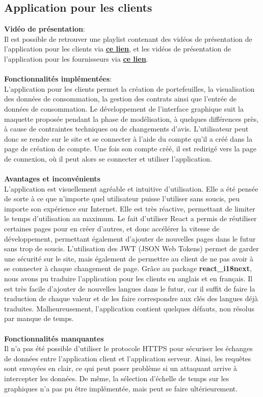 \documentclass[../rapport.tex]{subfiles}
\begin{document}
\subsection{Application pour les clients}
\noindent \textbf{Vidéo de présentation}: \\ 
Il est possible de retrouver une playlist contenant des vidéos de présentation de l'application pour les clients via \href{https://www.youtube.com/playlist?list=PLchvW_pzTBEoOUYVuWbljnQA548oJUMm5}{\textbf{ce lien}}, et les vidéos de présentation de l'application pour les fournisseurs via \href{https://youtube.com/playlist?list=PLoqkbU5JK0C9hzut7JvQ1AznLSYIX3d5O}{\textbf{ce lien}}. \\ \\
\textbf{Fonctionnalités implémentées}: \\
L'application pour les clients permet la création de portefeuilles, la visualisation des données de consommation, la gestion des contrats ainsi que l'entrée de données de consommation. 
Le développement de l'interface graphique suit la maquette proposée pendant la phase de modélisation, à quelques différences près, à cause de contraintes techniques ou de changements d'avis. L'utilisateur peut donc se rendre sur le site et se connecter à l'aide du compte qu'il a créé dans la page de création de compte. Une fois son compte créé, il est redirigé vers la page de connexion, où il peut alors se connecter et utiliser l'application.
\\ \\
\textbf{Avantages et inconvénients} \\
L'application est visuellement agréable et intuitive d'utilisation. Elle a été pensée de sorte à ce que n'importe quel utilisateur puisse l'utiliser sans soucis, peu importe son expérience sur Internet. Elle est très réactive, permettant de limiter le temps d'utilisation au maximum. Le fait d'utiliser React a permis de réutiliser certaines pages pour en créer d'autres, et donc accélérer la vitesse de développement, permettant également d'ajouter de nouvelles pages dans le futur sans trop de soucis. L'utilisation des JWT (JSON Web Tokens) permet de garder une sécurité sur le site, mais également de permettre au client de ne pas avoir à se connecter à chaque changement de page.
Grâce au package \textbf{react\_i18next}, nous avons pu traduire l'application pour les clients en anglais et en français. Il est très facile d'ajouter de nouvelles langues dans le futur, car il suffit de faire la traduction de chaque valeur et de les faire correspondre aux clés des langues déjà traduites.
Malheureusement, l'application contient quelques défauts, non résolus par manque de temps. 
\\ \\
\textbf{Fonctionnalités manquantes} \\
Il n'a pas été possible d'utiliser le protocole HTTPS pour sécuriser les échanges de données entre l'application client et l'application serveur. Ainsi, les requêtes sont envoyées en clair, ce qui peut poser problème si un attaquant arrive à intercepter les données. De même, la sélection d'échelle de temps sur les graphiques n'a pas pu être implémentée, mais peut se faire ultérieurement.
\end{document}
